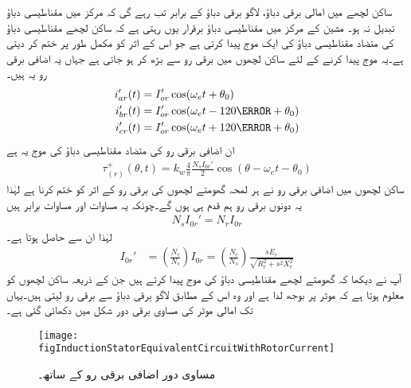 ساکن لچھے میں امالی برقی دباؤ،  لاگو برقی دباؤ کے برابر تب رہے گی کہ مرکز میں مقناطیسی دباؤ تبدیل نہ ہو۔ مشین کے مرکز میں مقناطیسی دباؤ برقرار یوں رہتی ہے کہ ساکن لچھے  مقناطیسی دباؤ   کی متضاد مقناطیسی دباؤ کی ایک موج پیدا کرتی ہے جو اس کے اثر کو مکمل طور پر ختم کر دیتی ہے۔یہ موج پیدا کرنے کے لئے ساکن لچھوں میں برقی رو  سے بڑھ کر  ہو جاتی ہے جہاں یہ اضافی برقی رو یہ ہیں۔
\begin{gather}
\begin{aligned}\label{مساوات_امالی_تین_رو_الف}
i_{ar}'(t)&=I_{or}' \cos (\omega_e t+\theta_0)\\
i_{br}'(t)&=I_{or}' \cos (\omega_e t-120\degree+\theta_0)\\
i_{cr}'(t)&=I_{or}' \cos (\omega_e t+120\degree+\theta_0)
\end{aligned}
\end{gather}
ان اضافی برقی رو کی متضاد مقناطیسی دباؤ کی موج یہ ہے
\begin{align}
\tau_{(r)}^+(\theta,t)=k_w \frac{4}{\pi}\frac{N_s I_{0r}'}{2} \cos (\theta-\omega_e t -\theta_0)
\end{align}
ساکن لچھوں میں اضافی برقی رو نے ہر لمحہ گھومتے لچھوں کی برقی رو کے اثر کو ختم کرنا ہے لہٰذا یہ دونوں برقی رو ہم قدم ہی ہوں گے۔چونکہ یہ مساوات اور مساوات   برابر ہیں
\begin{align}
N_s I_{0r}'=N_r I_{0r}
\end{align}
 لہٰذا ان سے حاصل ہوتا ہے۔
\begin{align}
I_{0r}'&=\left(\frac{N_r}{N_s}\right) I_{0r}=\left(\frac{N_r}{N_s}\right) \frac{s E_r}{\sqrt{R_r^2+s^2 X_r^2}}
\end{align}
آپ نے دیکھا کہ گھومتے لچھے مقناطیسی دباؤ کی موج پیدا کرتے ہیں جن کے ذریعہ ساکن لچھوں کو معلوم ہوتا ہے کہ موٹر پر بوجھ لدا ہے اور وہ اس کے مطابق لاگو برقی دباؤ سے برقی رو لیتی ہیں۔یہاں تک امالی موٹر کی مساوی برقی دور شکل   میں دکھائی گئی ہے۔
\begin{figure}
\centering
\texttt{[image: figInductionStatorEquivalentCircuitWithRotorCurrent]}
\caption{مساوی دور اضافی برقی رو کے ساتھ۔}
\label{شکل_امالی_ساکن_کا_مساوی_دور_بمع_گھومتے_لچھے_کی_رو}
\end{figure}

